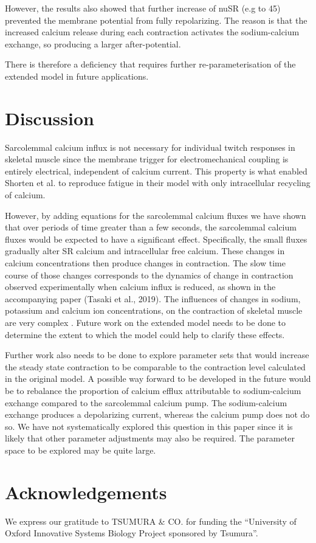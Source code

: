 \documentclass[fleqn,10pt]{physiome}
\begin{document}
However, the results also showed that further increase of nuSR (e.g to 45) prevented the membrane potential from fully repolarizing. The reason is that the increased calcium release during each contraction activates the sodium-calcium exchange, so producing a larger after-potential. 

There is therefore a deficiency that requires further re-parameterisation of the extended model in future applications.\newline

\section{Discussion}


Sarcolemmal calcium influx is not necessary for individual twitch responses in skeletal muscle since the membrane trigger for electromechanical coupling is entirely electrical, independent of calcium current. This property is what enabled Shorten et al. \citep{shorten2007mathematical} to reproduce fatigue in their model with only intracellular recycling of calcium.\newline

However, by adding equations for the sarcolemmal calcium fluxes we have shown that over periods of time greater than a few seconds, the sarcolemmal calcium fluxes would be expected to have a significant effect.  Specifically, the small fluxes gradually alter SR calcium and intracellular free calcium. These changes in calcium concentrations then produce changes in contraction. The slow time course of those changes corresponds to the dynamics of change in contraction observed experimentally when calcium influx is reduced, as shown in the accompanying paper (Tasaki et al., 2019). The influences of changes in sodium, potassium and calcium ion concentrations, on the contraction of skeletal muscle are very complex \citep{cairns1998role, cairns2003changes, cairns2008multiple}. Future work on the extended model needs to be done to determine the extent to which the model could help to clarify these effects. \newline

Further work also needs to be done to explore parameter sets that would increase the steady state contraction to be comparable to the contraction level calculated in the original model. A possible way forward to be developed in the future would be to rebalance the proportion of calcium efflux attributable to sodium-calcium exchange compared to the sarcolemmal calcium pump. The sodium-calcium exchange produces a depolarizing current, whereas the calcium pump does not do so. We have not systematically explored this question in this paper since it is likely that other parameter adjustments may also be required. The parameter space to be explored may be quite large.

\section{Acknowledgements}
We express our gratitude to TSUMURA & CO. for funding the “University of Oxford Innovative Systems Biology Project sponsored by Tsumura”. 


\end{document}

